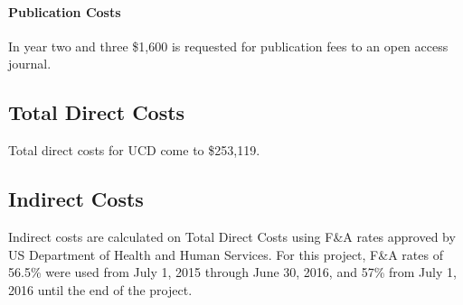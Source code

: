 \documentclass[11pt,letterpaper]{article}
\begin{document}



\paragraph{Publication Costs}
In year two and three \$1,600 is requested for publication fees to an open access journal. 

\subsection*{Total Direct Costs}

Total direct costs for UCD come to \$253,119.  

\subsection*{Indirect Costs}
Indirect costs are calculated on Total Direct Costs using F\&A rates approved by US Department of Health and Human Services. For this project, F\&A rates of 56.5\% were used from July 1, 2015 through June 30, 2016, and 57\% from July 1, 2016 until the end of the project.
\end{document}
